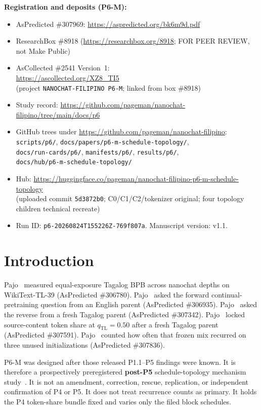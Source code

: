 \documentclass[11pt,a4paper]{article}
\begin{document}
\noindent\textbf{Registration and deposits (P6-M):}
\begin{itemize}[leftmargin=1.6em,itemsep=0.2em]
\item AsPredicted \#307969: \url{https://aspredicted.org/bk6m9d.pdf}
\item ResearchBox \#8918 (\url{https://researchbox.org/8918}; FOR PEER REVIEW, not Make Public)
\item AsCollected \#2541 Version~1:\\
\url{https://ascollected.org/XZ8_TI5}\\
(project \texttt{NANOCHAT-FILIPINO P6-M}; linked from box \#8918)
\item Study record: \url{https://github.com/pageman/nanochat-filipino/tree/main/docs/p6}
\item GitHub trees under \url{https://github.com/pageman/nanochat-filipino}:\\
\texttt{scripts/p6/}, \texttt{docs/papers/p6-m-schedule-topology/},\\
\texttt{docs/run-cards/p6/}, \texttt{manifests/p6/}, \texttt{results/p6/},\\
\texttt{docs/hub/p6-m-schedule-topology/}
\item Hub: \url{https://huggingface.co/pageman/nanochat-filipino-p6-m-schedule-topology}\\
(uploaded commit \texttt{5d3872b0}; C0/C1/C2/tokenizer original; four topology children technical recreate)
\item Run ID: \texttt{p6-20260824T155226Z-769f807a}. Manuscript version: v1.1.
\end{itemize}

\section{Introduction}
\label{sec:intro}

Pajo~\cite{pajo2026p11} measured equal-exposure Tagalog BPB across nanochat depths on WikiText-TL-39 (AsPredicted \#306780). Pajo~\cite{pajo2026p2} asked the forward continual-pretraining question from an English parent (AsPredicted \#306935). Pajo~\cite{pajo2026p3} asked the reverse from a fresh Tagalog parent (AsPredicted \#307342). Pajo~\cite{pajo2026p4} locked source-content token share at $q_{\mathrm{TL}}=0.50$ after a fresh Tagalog parent (AsPredicted \#307591). Pajo~\cite{pajo2026p5} counted how often that frozen mix recurred on three unused initializations (AsPredicted \#307836).

P6-M was designed after those released P1.1--P5 findings were known. It is therefore a prospectively preregistered \textbf{post-P5} schedule-topology mechanism study~\cite{aspredicted307969}. It is not an amendment, correction, rescue, replication, or independent confirmation of P4 or P5. It does not treat recurrence counts as primary. It holds the P4 token-share bundle fixed and varies only the filed block schedules.
\end{document}
